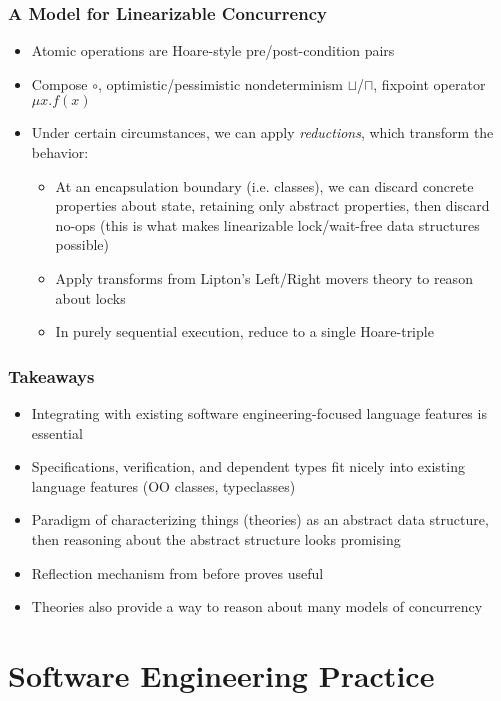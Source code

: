 \documentclass{beamer}
\begin{document}
\begin{frame}
  \frametitle{A Model for Linearizable Concurrency}
  \begin{itemize}
    \item Atomic operations are Hoare-style pre/post-condition pairs
    \item Compose $\circ$, optimistic/pessimistic nondeterminism
      $\sqcup$/$\sqcap$, fixpoint operator $\mu x. f(x)$
    \item Under certain circumstances, we can apply \emph{reductions},
      which transform the behavior:
      \begin{itemize}
        \item At an encapsulation boundary (i.e. classes), we can
          discard concrete properties about state, retaining only
          abstract properties, then discard no-ops (this is what makes
          linearizable lock/wait-free data structures possible)
        \item Apply transforms from Lipton's Left/Right movers theory
          to reason about locks
        \item In purely sequential execution, reduce to a single
          Hoare-triple
      \end{itemize}
  \end{itemize}
\end{frame}

\begin{frame}
  \frametitle{Takeaways}
  \begin{itemize}
    \item Integrating with existing software engineering-focused
      language features is essential
    \item Specifications, verification, and dependent types fit nicely
      into existing language features (OO classes, typeclasses)
    \item Paradigm of characterizing things (theories) as an abstract
      data structure, then reasoning about the abstract structure
      looks promising
    \item Reflection mechanism from before proves useful
    \item Theories also provide a way to reason about many models of
      concurrency
  \end{itemize}
\end{frame}

\section{Software Engineering Practice}
\end{document}
